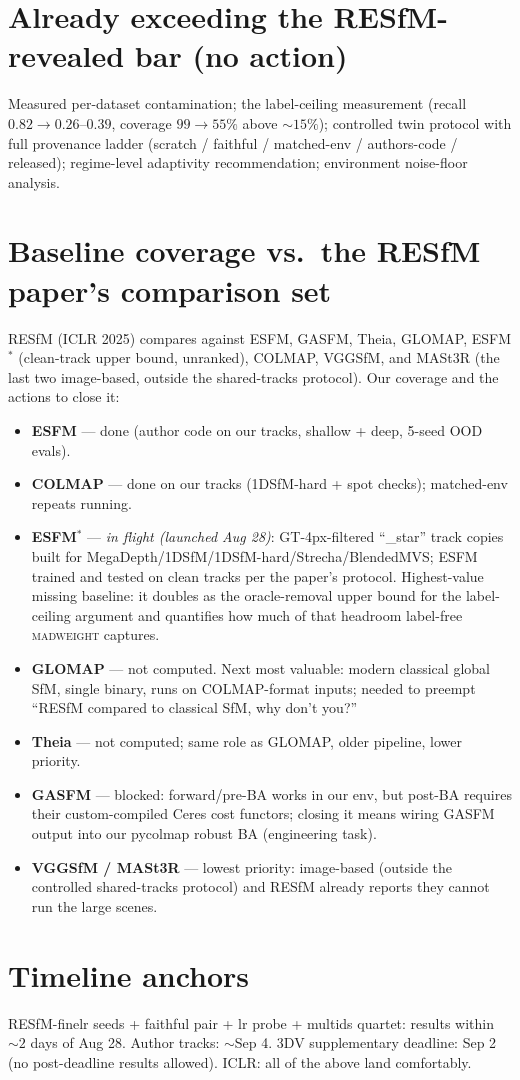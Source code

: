 \documentclass[10pt]{article}
\begin{document}
\section*{Already exceeding the RESfM-revealed bar (no action)}
Measured per-dataset contamination; the label-ceiling measurement (recall $0.82\!\to\!0.26$--$0.39$,
coverage $99\!\to\!55\%$ above ${\sim}15\%$); controlled twin protocol with full provenance
ladder (scratch / faithful / matched-env / authors-code / released); regime-level
adaptivity recommendation; environment noise-floor analysis.


\section*{Baseline coverage vs.\ the RESfM paper's comparison set}
RESfM (ICLR 2025) compares against ESFM, GASFM, Theia, GLOMAP, ESFM$^\ast$ (clean-track
upper bound, unranked), COLMAP, VGGSfM, and MASt3R (the last two image-based, outside the
shared-tracks protocol). Our coverage and the actions to close it:
\begin{itemize}[leftmargin=1.4em]
\item \textbf{ESFM} --- done (author code on our tracks, shallow + deep, 5-seed OOD evals).
\item \textbf{COLMAP} --- done on our tracks (1DSfM-hard + spot checks); matched-env
repeats running.
\item \textbf{ESFM$^\ast$} --- \emph{in flight (launched Aug 28)}: GT-4px-filtered
``\_star'' track copies built for MegaDepth/1DSfM/1DSfM-hard/Strecha/BlendedMVS; ESFM
trained and tested on clean tracks per the paper's protocol. Highest-value missing
baseline: it doubles as the oracle-removal upper bound for the label-ceiling argument and
quantifies how much of that headroom label-free \textsc{madweight} captures.
\item \textbf{GLOMAP} --- not computed. Next most valuable: modern classical global SfM,
single binary, runs on COLMAP-format inputs; needed to preempt ``RESfM compared to
classical SfM, why don't you?''
\item \textbf{Theia} --- not computed; same role as GLOMAP, older pipeline, lower priority.
\item \textbf{GASFM} --- blocked: forward/pre-BA works in our env, but post-BA requires
their custom-compiled Ceres cost functors; closing it means wiring GASFM output into our
pycolmap robust BA (engineering task).
\item \textbf{VGGSfM / MASt3R} --- lowest priority: image-based (outside the controlled
shared-tracks protocol) and RESfM already reports they cannot run the large scenes.
\end{itemize}

\section*{Timeline anchors}
RESfM-finelr seeds + faithful pair + lr probe + multids quartet: results within ${\sim}2$
days of Aug 28. Author tracks: ${\sim}$Sep 4. 3DV supplementary deadline: Sep 2 (no
post-deadline results allowed). ICLR: all of the above land comfortably.
\end{document}
